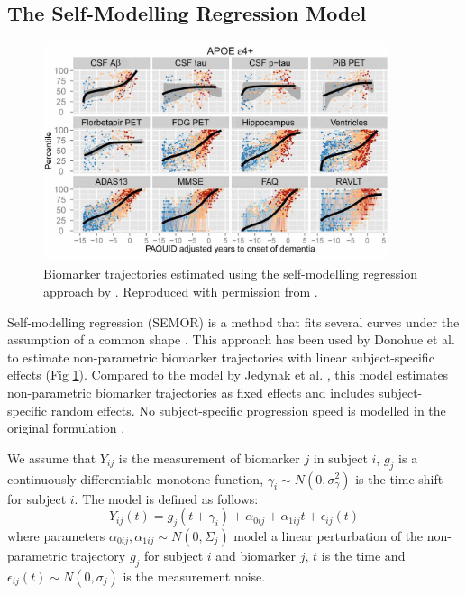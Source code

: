 \subsection{The Self-Modelling Regression Model}
\label{sec:bckSem}

\begin{figure}
\centering
\includegraphics[width=0.9\textwidth]{images/semor_diagram_cropped}
\caption[ADNI Biomarker trajectories estimated by Donohue et al. \cite{donohue2014estimating}]{Biomarker trajectories estimated using the self-modelling regression approach by \cite{donohue2014estimating}. Reproduced with permission from \cite{donohue2014estimating}.}
\label{fig:bckSem}
\end{figure}

Self-modelling regression (SEMOR) is a method that fits several curves under the assumption of a common shape \cite{donohue2014estimating}. This approach has been used by Donohue et al. \cite{donohue2014estimating} to estimate non-parametric biomarker trajectories with linear subject-specific effects (Fig \ref{fig:bckSem}). Compared to the model by Jedynak et al. \cite{jedynak2012computational}, this model estimates non-parametric biomarker trajectories as fixed effects and includes subject-specific random effects. No subject-specific progression speed is modelled in the original formulation \cite{donohue2014estimating}. 

We assume that $Y_{ij}$ is the measurement of biomarker $j$ in subject $i$, $g_j$ is a continuously differentiable monotone function, $\gamma_i \sim N(0, \sigma_{\gamma}^2)$ is the time shift for subject $i$. The model is defined as follows:
\begin{equation}
 \label{eq:semor1}
 Y_{ij}(t) = g_j(t +\gamma_i)+\alpha_{0ij} + \alpha_{1ij}t+\epsilon_{ij}(t)
\end{equation}
where parameters $\alpha_{0ij}, \alpha_{1ij} \sim N(0, \Sigma_j)$ model a linear perturbation of the non-parametric trajectory $g_j$ for subject $i$ and biomarker $j$, $t$ is the time and $\epsilon_{ij}(t) \sim N(0, \sigma_j)$ is the measurement noise.  


